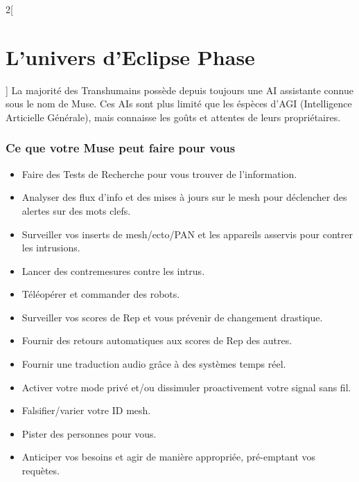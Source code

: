 \documentclass[a4paper,9pt]{article}
\begin{document}
\begin{multicols}{2}[\section{L'univers d'Eclipse Phase}]
La majorité des Transhumains possède depuis toujours une AI assistante connue sous le nom de Muse.
Ces AIs sont plus limité que les éspèces d'AGI (Intelligence Articielle Générale), mais connaisse
les goûts et attentes de leurs propriétaires.

\subsubsection{Ce que votre Muse peut faire pour vous}

\begin{itemize}
\item Faire des Tests de Recherche pour vous trouver de l'information.
\item Analyser des flux d'info et des mises à jours sur le mesh pour déclencher des alertes sur des mots clefs.
\item Surveiller vos inserts de mesh/ecto/PAN et les appareils asservis pour contrer les intrusions.
\item Lancer des contremesures contre les intrus.
\item Téléopérer et commander des robots.
\item Surveiller vos scores de Rep et vous prévenir de changement drastique.
\item Fournir des retours automatiques aux scores de Rep des autres.
\item Fournir une traduction audio grâce à des systèmes temps réel.
\item Activer votre mode privé et/ou dissimuler proactivement votre signal sans fil.
\item Falsifier/varier votre ID mesh.
\item Pister des personnes pour vous.
\item Anticiper vos besoins et agir de manière appropriée, pré-emptant vos requètes.
\end{itemize} 

\end{multicols}
\end{document}
